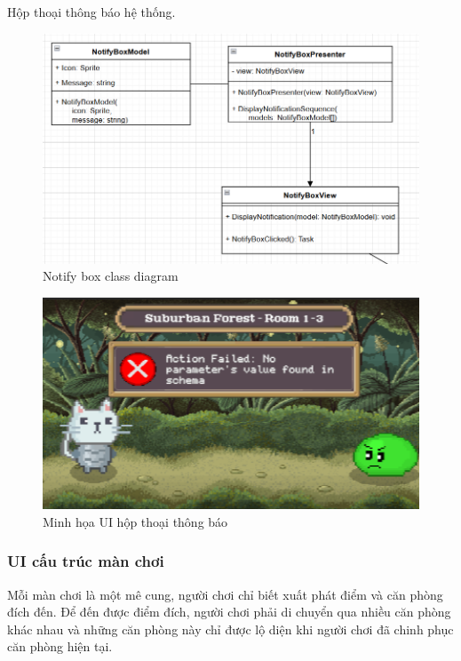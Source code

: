 Hộp thoại thông báo hệ thống.

\begin{figure}[H]
	\centering
	\includegraphics[width=13cm]{Images/NotifyBoxView.png}
	\vspace{0.5cm}
	\caption{Notify box class diagram}
\end{figure}

\begin{figure}[H]
	\centering
	\includegraphics[width=13cm]{Images/NotifyBoxUI.png}
	\vspace{0.5cm}
	\caption{Minh họa UI hộp thoại thông báo}
\end{figure}

\subsubsection{UI cấu trúc màn chơi}

Mỗi màn chơi là một mê cung, người chơi chỉ biết xuất phát điểm và căn phòng đích đến. Để đến được điểm đích, người chơi phải di chuyển qua nhiều căn phòng khác nhau và những căn phòng này chỉ được lộ diện khi người chơi đã chinh phục căn phòng hiện tại.


